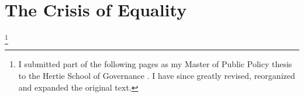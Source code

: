 


\section{The Crisis of Equality}\footnote{I submitted part of the following pages as my Master of Public Policy thesis to the Hertie School of Governance \citep{Held2010a}.
I have since greatly revised, reorganized and expanded the original text.}

